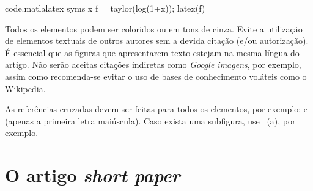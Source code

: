 \begin{matlabcode}{code.matlalatex}
  syms x
  f = taylor(log(1+x));
  latex(f)
\end{matlabcode}

Todos os elementos podem ser coloridos ou em tons de cinza. Evite a utilização de elementos textuais de outros autores sem a devida citação (e/ou autorização). É essencial que as figuras que apresentarem texto estejam na mesma língua do artigo. Não serão aceitas citações indiretas como \textit{Google imagens}, por exemplo, assim como recomenda-se evitar o uso de bases de conhecimento voláteis como o Wikipedia.

As referências cruzadas devem ser feitas para todos os elementos, por exemplo:  e  (apenas a primeira letra maiúscula). Caso exista uma subfigura, use ~(a), por exemplo.


\section{O artigo \textit{short paper}}

